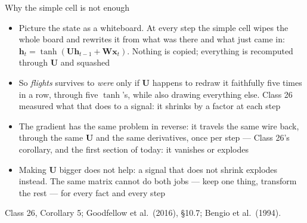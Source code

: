 \documentclass[aspectratio=169, 11pt]{beamer}
\newcommand{\srcline}[1]{%
  \par\vspace{0.25em}%
  {\scriptsize\color{mcMuted}\hfill #1\par}}
\newcommand{\src}[3]{}      %
\begin{document}
\begin{frame}{Why the simple cell is not enough}
  \src{goodfellow2016}{section}{10.7}
  \src{jurafsky_slp3}{section}{14.5}
  \vspace{0.05em}
  {\footnotesize
  \begin{itemize}\itemsep0.25em
    \item Picture the state as a \alert{whiteboard}. At every step the
          simple cell wipes the whole board and rewrites it from what was
          there and what just came in:
          $\mathbf{h}_t = \tanh(\mathbf{U}\mathbf{h}_{t-1} + \mathbf{W}\mathbf{x}_t)$. Nothing
          is copied; everything is recomputed through $\mathbf{U}$ and squashed
    \item So \emph{flights} survives to \emph{were} only if $\mathbf{U}$ happens
          to redraw it faithfully five times in a row, through five
          $\tanh$'s, while also drawing everything else. Class 26 measured
          what that does to a signal: it shrinks by a factor at each step
    \item The gradient has the same problem in reverse: it travels the
          same wire back, through the same $\mathbf{U}$ and the same
          derivatives, once per step --- Class 26's corollary, and the
          first section of today: it vanishes or explodes
    \item Making $\mathbf{U}$ bigger does not help: a signal that does not
          shrink explodes instead. The same matrix cannot do both jobs
          --- keep one thing, transform the rest --- for every fact and
          every step
  \end{itemize}}
  \srcline{Class 26, Corollary 5; Goodfellow et al.\ (2016), \S10.7; Bengio et al.\ (1994).}
\end{frame}
\end{document}
